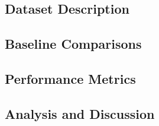 \subsection*{Dataset Description}
\subsection*{Baseline Comparisons}
\subsection*{Performance Metrics}
\subsection*{Analysis and Discussion}